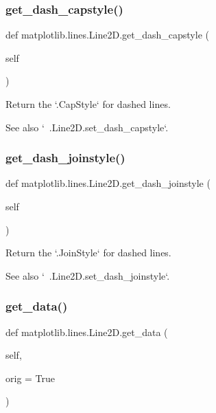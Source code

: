 \subsubsection{\texorpdfstring{get\+\_\+dash\+\_\+capstyle()}{get\_dash\_capstyle()}}
{\footnotesize\ttfamily def matplotlib.\+lines.\+Line2\+D.\+get\+\_\+dash\+\_\+capstyle (\begin{DoxyParamCaption}\item[{}]{self }\end{DoxyParamCaption})}

\begin{DoxyVerb}Return the `.CapStyle` for dashed lines.

See also `~.Line2D.set_dash_capstyle`.
\end{DoxyVerb}
 \mbox{\label{classmatplotlib_1_1lines_1_1Line2D_a475d151a158178a84dad23ebdd102208}} 
\subsubsection{\texorpdfstring{get\+\_\+dash\+\_\+joinstyle()}{get\_dash\_joinstyle()}}
{\footnotesize\ttfamily def matplotlib.\+lines.\+Line2\+D.\+get\+\_\+dash\+\_\+joinstyle (\begin{DoxyParamCaption}\item[{}]{self }\end{DoxyParamCaption})}

\begin{DoxyVerb}Return the `.JoinStyle` for dashed lines.

See also `~.Line2D.set_dash_joinstyle`.
\end{DoxyVerb}
 \mbox{\label{classmatplotlib_1_1lines_1_1Line2D_a841568ce9e6351d3687793c4d6f868e1}} 
\subsubsection{\texorpdfstring{get\+\_\+data()}{get\_data()}}
{\footnotesize\ttfamily def matplotlib.\+lines.\+Line2\+D.\+get\+\_\+data (\begin{DoxyParamCaption}\item[{}]{self,  }\item[{}]{orig = {\ttfamily True} }\end{DoxyParamCaption})}

